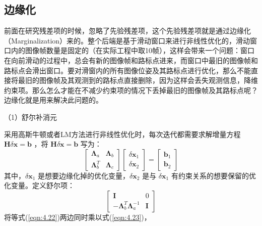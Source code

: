 \subsection{边缘化}
前面在研究残差项的时候，忽略了先验残差项，这个先验残差项就是通过边缘化（Marginalization）来的。整个后端是基于滑动窗口来进行非线性优化的，滑动窗口内的图像帧数量是固定的（在实际工程中取10帧），这样会带来一个问题：窗口在向前滑动的过程中，总会有新的图像帧和路标点进来，而窗口中最旧的图像帧和路标点会滑出窗口。要对滑窗内的所有图像位姿及其路标点进行优化，那么不能直接将最旧的图像帧及其观测到的路标点直接删除，因为这样会丢失观测信息，降维约束项。那么怎么才能在不减少约束项的情况下丢掉最旧的图像帧及其路标点呢？边缘化就是用来解决此问题的。

（1）舒尔补消元

采用高斯牛顿或者LM方法进行非线性优化时，每次迭代都需要求解增量方程 $\mathbf{H}\delta \mathbf{x}=\mathbf{b} $ ，将 $\mathbf{H}\delta \mathbf{x}=\mathbf{b} $ 写为：
\begin{equation}
\label{eqn:4.22}
\left[ \begin{array}{cc}
{\bm{\Lambda}_{a}} & {\bm{\Lambda}_{b}} \\ 
{\bm{\Lambda}_{b}^{T}} & {\bm{\Lambda}_{c}}
\end{array}\right] 
\left[ \begin{array}{c}
{\delta \mathbf{x}_{1}} \\ {\delta \mathbf{x}_{2}}
\end{array}\right]
=\left[ \begin{array}
{l}{\mathbf{b}_{1}} \\ {\mathbf{b}_{2}}
\end{array}\right]
\end{equation}
其中，$\delta \mathbf{x}_1 $ 是想要边缘化掉的优化变量，$\delta \mathbf{x}_2 $ 是与 $\delta \mathbf{x}_1 $ 有约束关系的想要保留的优化变量。定义舒尔项：
\begin{equation}
\label{eqn:4.23}
\left[ \begin{array}{cc}
{\mathbf{I}} & {0} \\ 
{-\bm{\Lambda}_{b}^{T} \bm{\Lambda}_{a}^{-1}} & {\mathbf{I}}\end{array}\right]
\end{equation}
将等式(\ref{eqn:4.22})两边同时乘以式(\ref{eqn:4.23})，
